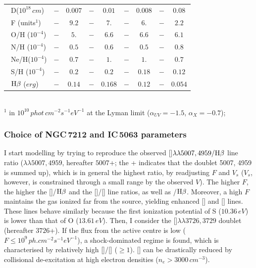 \documentclass[../thesis.tex]{subfiles}
\begin{document}
\begin{table}
\begin{tabular}{lcccccccc}
\ D($10^{18}\,\si{cm}$)      &$-      $&$ 0.007$&$-    $&$0.01  $&$-     $&$0.008 $&$-     $&$0.08  $\\            
\ F (units$^1$)       &$-      $&$ 9.2  $&$-    $&$7.    $&$-     $&$6.    $&$-    $&$2.2     $\\            
\ O/H ($10^{-4}$)     &$-      $&$ 5.   $&$-    $&$6.6   $&$-     $&$6.6   $&$-     $&$6.1     $\\            
\ N/H ($10^{-4}$)     &$-      $&$ 0.5  $&$-    $&$0.6   $&$-     $&$0.5   $&$-     $&$0.8     $\\            
\ Ne/H($10^{-4}$)     &$-      $&$ 0.7  $&$-    $&$1.    $&$-     $&$1.    $&$-     $&$0.7    $\\            
\ S/H ($10^{-4}$)     &$-      $&$ 0.2  $&$-    $&$0.2   $&$-     $&$0.18  $&$-     $&$0.12    $\\            
\ $\rm H\beta$ ($\si{erg}$)          &$-      $&$0.14  $&$-    $&$0.168 $&$-     $&$0.12  $&$-     $&$0.054   $\\            
\hline
\end{tabular}
\\
$^1$ in $10^{10}\,\si{phot\,cm^{-2} s^{-1} eV^{-1}}$ at the Lyman limit
(${\alpha}_{UV}=-1.5$, ${\alpha}_X=-0.7$);

\end{table}

\subsubsection{Choice of  NGC\,7212 and IC\,5063 parameters}
\label{sec:parameters}

I start modelling by trying to reproduce the observed []$\lambda\lambda5007,4959/\rm H\beta$ line ratio ($\lambda\lambda5007,4959$, hereafter $5007$+; the + indicates that the doublet 5007, 4959 is summed up), which is in general  the highest  ratio, by readjusting $F$ and $V_s$ ($V_s$, however, is constrained through a small range by the observed $V$). 
The higher $F$, the higher the []/$\rm H\beta$ and the []/[] line ratios, as well as /$\rm H\beta$. 
Moreover, a high $F$ maintains the gas ionized far from the source, yielding enhanced [] and [] lines. 
These lines behave similarly because the first ionization potential of S ($10.36\,\si{ eV}$) is lower than that of O ($13.61\,\si{ eV}$).
Then, I consider the []$\lambda\lambda3726,3729$ doublet (hereafter $3726$+). 
If the flux from the active centre is low ($F \leq 10^9\,\si{ph.cm^{-2} s^{-1} eV^{-1}}$), a shock-dominated regime is found, which is characterised by relatively high []/[] ($\geq 1$). 
[] can be drastically reduced by collisional de-excitation at high electron densities ($n_e >  3000\,\si{cm^{-3}}$).
\end{document}
